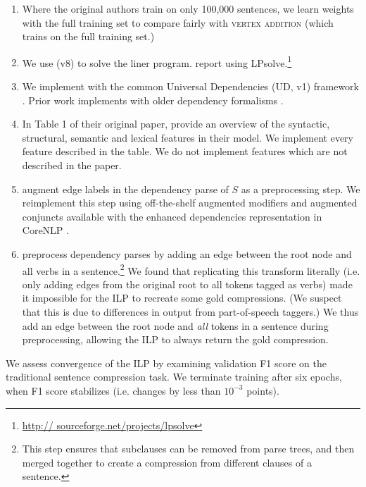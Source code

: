 \begin{enumerate}
\item{Where the original authors train on only 100,000 sentences, we learn weights with the full training set to compare fairly with \textsc{vertex addition} (which trains on the full training set.)}
\item{We use \citet{gurobi} (v8) to solve the liner program. \citet{filippova2008dependency} report using LPsolve.\footnote{\url{http://
sourceforge.net/projects/lpsolve}}}
\item{We implement with the common Universal Dependencies (UD, v1) framework \cite{Nivre2016UniversalDV}. Prior work \cite{filippova2008dependency} implements with older dependency formalisms \cite{briscoe-etal-2006-second,Marneffe2006GeneratingTD}.} 
\item{In Table 1 of their original paper, \citet{filippova2013overcoming} provide an overview of the syntactic, structural, semantic and lexical features in their model. We implement every feature described in the table. We do not implement features which are not described in the paper.}
\item{\citet{filippova2013overcoming} augment edge labels in the dependency parse of $S$ as a preprocessing step. We reimplement this step using off-the-shelf augmented modifiers and augmented conjuncts available with the enhanced dependencies representation in CoreNLP \cite{Schuster2016EnhancedEU}.}
\item{\citet{filippova2013overcoming} preprocess dependency parses by adding an edge between the root node and all verbs in a sentence.\footnote{This step ensures that subclauses can be removed from parse trees, and then merged together to create a compression from different clauses of a sentence.} We found that replicating this transform literally (i.e. only adding edges from the original root to all tokens tagged as verbs) made it impossible for the ILP to recreate some gold compressions. (We suspect that this is due to differences in output from part-of-speech taggers.) We thus add an edge between the root node and \textit{all} tokens in a sentence during preprocessing, allowing the ILP to always return the gold compression.}
\end{enumerate}

We assess convergence of the ILP by examining validation F1 score on the traditional sentence compression task. We terminate training after six epochs, when F1 score stabilizes (i.e. changes by less than $10^{-3}$ points).

